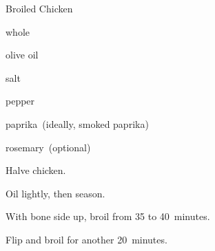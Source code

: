 \begin{recipe}{Broiled Chicken}{}{}

\begin{ingredients}
\item whole 
\item olive oil
\item salt
\item pepper
\item paprika~(ideally, smoked paprika)
\item rosemary~(optional)
\end{ingredients}

\begin{directions}
\item Halve chicken.
\item Oil lightly, then season.
\item With bone side up, broil from 35 to 40~minutes.
\item Flip and broil for another 20~minutes.
\end{directions}

\end{recipe}

